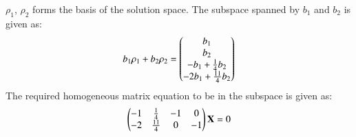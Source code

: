 \documentclass[journal,12pt,twocolumn]{IEEEtran}
\begin{document}
$\rho_1$, $\rho_2$ forms the basis of the solution space. The subspace spanned by $b_1$ and $b_2$ is given as:
\begin{align}
b_1\rho_1+b_2\rho_2=\begin{pmatrix}b_1\\b_2\\-b_1+\frac{1}{4}b_2\\-2b_1+\frac{11}{4}b_2\end{pmatrix}
 \end{align}
  The required homogeneous matrix equation to be in the subspace is given as:
 \begin{align}
\begin{pmatrix}-1&\frac{1}{4}&-1&0\\-2&\frac{11}{4}&0&-1\end{pmatrix}\mathbf{X}=0
\end{align}
\end{document}
